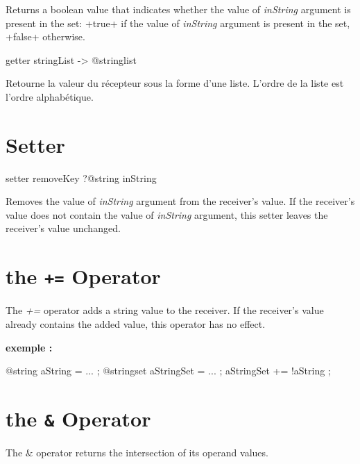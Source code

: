 Returns a boolean value that indicates whether the value of \emph{inString} argument is present in the set: \ggsq+true+ if the value of \emph{inString} argument is present in the set, \ggsq+false+ otherwise.





\begin{galgas4}
getter stringList -> @stringlist
\end{galgas4}

Retourne la valeur du récepteur sous la forme d'une liste. L'ordre de la liste est l'ordre alphabétique.



\section{Setter}


\begin{galgas4}
setter removeKey ?@string inString
\end{galgas4}


Removes the value of \emph{inString} argument from the receiver's value. If the receiver's value does not contain the value of \emph{inString} argument, this setter leaves the receiver's value unchanged.






\section{the \texttt{+=} Operator}

The \emph{+=} operator adds a string value to the receiver. If the receiver's value already contains the added value, this operator has no effect.

\textbf{exemple :}
\begin{galgas4}
@string aString = ... ;
@stringset aStringSet = ... ;
aStringSet += !aString ;
\end{galgas4}




\section{the \texttt{\&} Operator}

The \emph{$\&$} operator returns the intersection of its operand values.

